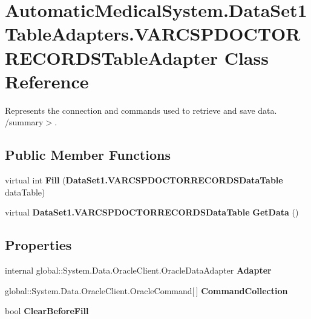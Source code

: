 \section{AutomaticMedicalSystem.DataSet1TableAdapters.VARCSPDOCTORRECORDSTableAdapter Class Reference}
\label{class_automatic_medical_system_1_1_data_set1_table_adapters_1_1_v_a_r_c_s_p_d_o_c_t_o_r_r_e_c_o_r_d_s_table_adapter}
Represents the connection and commands used to retrieve and save data. /summary$>$.  


\subsection*{Public Member Functions}
\begin{CompactItemize}
\item 
virtual int \textbf{Fill} ({\bf DataSet1.VARCSPDOCTORRECORDSDataTable} dataTable)\label{class_automatic_medical_system_1_1_data_set1_table_adapters_1_1_v_a_r_c_s_p_d_o_c_t_o_r_r_e_c_o_r_d_s_table_adapter_10f7416eb19bfbed898804f23bef988a}

\item 
virtual {\bf DataSet1.VARCSPDOCTORRECORDSDataTable} \textbf{GetData} ()\label{class_automatic_medical_system_1_1_data_set1_table_adapters_1_1_v_a_r_c_s_p_d_o_c_t_o_r_r_e_c_o_r_d_s_table_adapter_d0eefc0b9fbc208c7d299c648f81a8c3}

\end{CompactItemize}
\subsection*{Properties}
\begin{CompactItemize}
\item 
internal global::System.Data.OracleClient.OracleDataAdapter \textbf{Adapter}\hspace{0.3cm}{\tt  [get]}\label{class_automatic_medical_system_1_1_data_set1_table_adapters_1_1_v_a_r_c_s_p_d_o_c_t_o_r_r_e_c_o_r_d_s_table_adapter_8f823ccb2a77d7f1386aa67cb628a213}

\item 
global::System.Data.OracleClient.OracleCommand[$\,$] \textbf{CommandCollection}\hspace{0.3cm}{\tt  [get]}\label{class_automatic_medical_system_1_1_data_set1_table_adapters_1_1_v_a_r_c_s_p_d_o_c_t_o_r_r_e_c_o_r_d_s_table_adapter_fbf2b0311a86fe7ba2801f06edbd9a7e}

\item 
bool \textbf{ClearBeforeFill}\hspace{0.3cm}{\tt  [get, set]}\label{class_automatic_medical_system_1_1_data_set1_table_adapters_1_1_v_a_r_c_s_p_d_o_c_t_o_r_r_e_c_o_r_d_s_table_adapter_7c33c5b99c50dfd4ccbd830f832d660e}

\end{CompactItemize}


